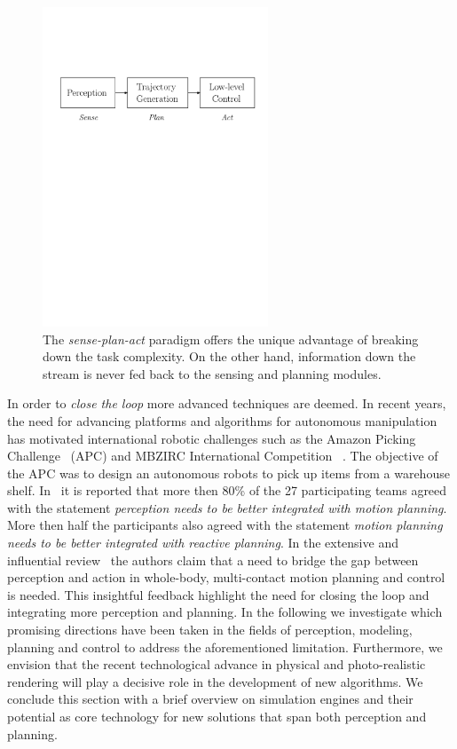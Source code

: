 \begin{figure}[h!]
    \centering
    \includegraphics[width=0.6\textwidth]{images/sense_plan_act.pdf}
    \caption{The \emph{sense-plan-act} paradigm offers the unique advantage of breaking down the task complexity. On the other hand, information down the stream is never fed back to the sensing and planning modules.}
    \label{fig:sense_plan_act}
\end{figure}

In order to \emph{close the loop} more advanced techniques are deemed. In recent years, the need for advancing platforms and  
algorithms for autonomous manipulation has motivated international robotic challenges such as the Amazon Picking Challenge~\cite{correll2016analysis} (APC) and MBZIRC International Competition ~\cite{baca2020autonomous}. The objective of the APC was to design an autonomous robots to pick up items from a warehouse shelf. In~\cite{cooper2020ari} it is reported that more then 80\% of the 27 participating teams agreed with the statement \emph{perception needs to be better integrated with motion planning}. More then half the participants also agreed with the statement \emph{motion planning needs to be better integrated with reactive planning}. In the extensive and influential review~\cite{bohg2017interactive} the authors claim that a need to bridge the gap between perception and action in whole-body, multi-contact motion planning and control is needed. This insightful feedback highlight the need for closing the loop and integrating more perception and planning. In the following we investigate which promising directions have been taken in the fields of perception, modeling, planning and control to address the aforementioned limitation. Furthermore, we envision that the recent technological advance in physical and photo-realistic rendering will play a decisive role in the development of new algorithms. We conclude this section with a brief overview on simulation engines and their potential as core technology for new solutions that span both perception and planning. 

